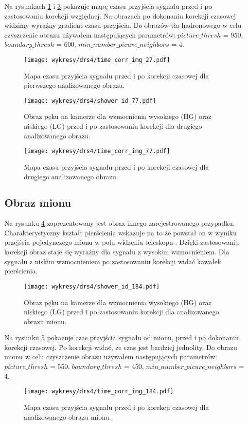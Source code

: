\documentclass[a4paper,11pt,twoside]{article}
\begin{document}
Na rysunkach \ref{fig:map_time_27} i \ref{fig:map_time_corr_77} pokazuje mapę czasu przyjścia sygnału przed i po zastosowaniu korekcji względnej. Na obrazach po dokonaniu korekcji czasowej widzimy wyraźny gradient czasu przyjścia. Do obrazów tła hadronowego w celu czyszczenie obrazu używałem następujących parametrów: $picture\_thresh$ = 950, $boundary\_thresh$ = 600, $min\_number\_picure\_neighbors$ = 4.
\begin{figure}[H] 
\centering
\texttt{[image: wykresy/drs4/time\_corr\_img\_27.pdf]}
\caption{Mapa czasu przyjścia sygnału przed i po korekcji czasowej dla pierwszego analizowanego obrazu.}
\label{fig:map_time_27}
\end{figure}
\newpage
\begin{figure}[H] 
\centering
\texttt{[image: wykresy/drs4/shower\_id\_77.pdf]}
\caption{Obraz pęku na kamerze dla wzmocnienia wysokiego (HG) oraz niskiego (LG) przed i po zastosowaniu korekcji dla drugiego analizowanego obrazu.}
\label{fig:image_77}
\end{figure}
 
\begin{figure}[H] 
\centering
\texttt{[image: wykresy/drs4/time\_corr\_img\_77.pdf]}
\caption{Mapa czasu przyjścia sygnału przed i po korekcji czasowej dla drugiego analizowanego obrazu.}
\label{fig:map_time_corr_77}
\end{figure}

\subsection{Obraz mionu}
Na rysunku \ref{fig:muon_image} zaprezentowany jest obraz innego zarejestrowanego przypadku. 
Charakterystyczny kształt pierścienia wskazuje na to że powstał on w wyniku przejścia pojedynczego mionu w polu widzenia teleskopu \cite{muon_ring}. Dzięki zastosowaniu korekcji obraz staje się wyraźny dla sygnału z wysokim wzmocnieniem. Dla sygnału z niskim wzmocnieniem po zastosowaniu korekcji widać kawałek pierścienia. 
\begin{figure}[H] 
\centering
\texttt{[image: wykresy/drs4/shower\_id\_184.pdf]}
\caption{Obraz pęku na kamerze dla wzmocnienia wysokiego (HG) oraz niskiego (LG) przed i po zastosowaniu korekcji dla analizowanego obrazu mionu.}
\label{fig:muon_image}
\end{figure}



Na rysunku \ref{fig:time_corr_map_muon} pokazuje czas przyjścia sygnału od mionu, przed i po dokonaniu korekcji czasowej. Po korekcji widać, że czas jest bardziej jednolity.
Do obrazu mionu w celu czyszczenie obrazu używałem następujących parametrów: $picture\_thresh$ = 550, $boundary\_thresh$ = 450, $min\_number\_picure\_neighbors$ = 4.
\begin{figure}[H] 
\centering
\texttt{[image: wykresy/drs4/time\_corr\_img\_184.pdf]}
\caption{Mapa czasu przyjścia sygnału przed i po korekcji czasowej dla analizowanego obrazu mionu.}
\label{fig:time_corr_map_muon}
\end{figure}
\newpage
\end{document}
